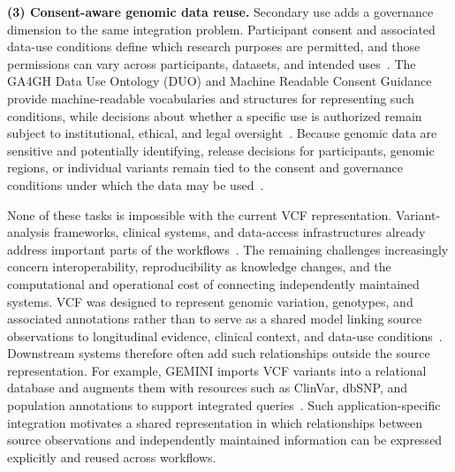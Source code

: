 \documentclass[pdflatex,sn-mathphys-num]{sn-jnl}
\begin{document}
\textbf{(3) Consent-aware genomic data reuse.}\label{uc:reuse}
Secondary use adds a governance dimension to the same integration problem.
Participant consent and associated data-use conditions define which research purposes are permitted, and those permissions can vary across participants, datasets, and intended uses~\cite{lawson2021duo,rehm2021ga4gh}.
The GA4GH Data Use Ontology (DUO) and Machine Readable Consent Guidance provide machine-readable vocabularies and structures for representing such conditions, while decisions about whether a specific use is authorized remain subject to institutional, ethical, and legal oversight~\cite{lawson2021duo,ga4gh_mrcg,rehm2021ga4gh}.
Because genomic data are sensitive and potentially identifying, release decisions for participants, genomic regions, or individual variants remain tied to the consent and governance conditions under which the data may be used~\cite{gdpr2016,shabani2018gdpr}.

None of these tasks is impossible with the current VCF representation.
Variant-analysis frameworks, clinical systems, and data-access infrastructures already address important parts of the workflows~\cite{paila2013gemini,wake2022pgx,rehm2021ga4gh}.
The remaining challenges increasingly concern interoperability, reproducibility as knowledge changes, and the computational and operational cost of connecting independently maintained systems.
VCF was designed to represent genomic variation, genotypes, and associated annotations rather than to serve as a shared model linking source observations to longitudinal evidence, clinical context, and data-use conditions~\cite{vcf_intro}.
Downstream systems therefore often add such relationships outside the source representation.
For example, GEMINI imports VCF variants into a relational database and augments them with resources such as ClinVar, dbSNP, and population annotations to support integrated queries~\cite{paila2013gemini}.
Such application-specific integration motivates a shared representation in which relationships between source observations and independently maintained information can be expressed explicitly and reused across workflows.
\end{document}
